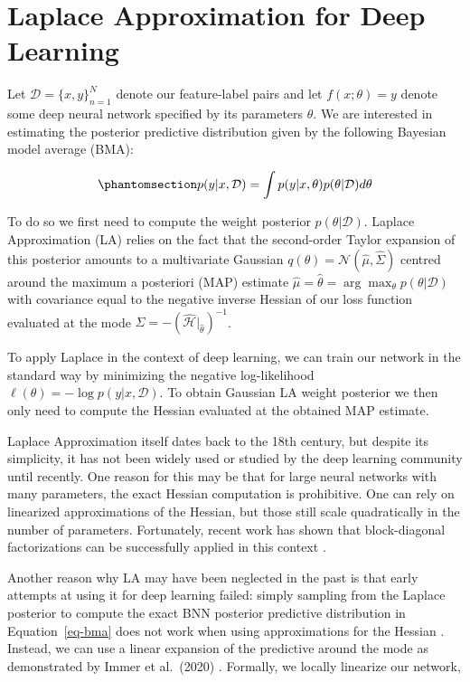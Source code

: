\documentclass{juliacon}
\begin{document}
\section{Laplace Approximation for Deep Learning}\label{sec-body}

Let \(\mathcal{D}=\{x,y\}_{n=1}^N\) denote our feature-label pairs and
let \(f(x;\theta)=y\) denote some deep neural network specified by its
parameters \(\theta\). We are interested in estimating the posterior
predictive distribution given by the following Bayesian model average
(BMA):

\begin{equation}\phantomsection\label{eq-bma}{
p(y|x,\mathcal{D}) = \int p(y|x,\theta)p(\theta|\mathcal{D})d\theta
}\end{equation}

To do so we first need to compute the weight posterior
\(p(\theta|\mathcal{D})\). Laplace Approximation (LA) relies on the fact
that the second-order Taylor expansion of this posterior amounts to a
multivariate Gaussian \(q(\theta)=\mathcal{N}(\hat\mu,\hat\Sigma)\)
centred around the maximum a posteriori (MAP) estimate
\(\hat\mu=\hat{\theta}=\arg\max_{\theta}p(\theta|\mathcal{D})\) with
covariance equal to the negative inverse Hessian of our loss function
evaluated at the mode
\(\hat{\Sigma}=-(\hat{\mathcal{H}}|_{\hat{\theta}})^{-1}\).

To apply Laplace in the context of deep learning, we can train our
network in the standard way by minimizing the negative log-likelihood
\(\ell(\theta)=-\log p(y|x,\mathcal{D})\). To obtain Gaussian LA weight
posterior we then only need to compute the Hessian evaluated at the
obtained MAP estimate.

Laplace Approximation itself dates back to the 18th century, but despite
its simplicity, it has not been widely used or studied by the deep
learning community until recently. One reason for this may be that for
large neural networks with many parameters, the exact Hessian
computation is prohibitive. One can rely on linearized approximations of
the Hessian, but those still scale quadratically in the number of
parameters. Fortunately, recent work has shown that block-diagonal
factorizations can be successfully applied in this context
\cite{martens2015optimizing}.

Another reason why LA may have been neglected in the past is that early
attempts at using it for deep learning failed: simply sampling from the
Laplace posterior to compute the exact BNN posterior predictive
distribution in Equation~\ref{eq-bma} does not work when using
approximations for the Hessian \cite{lawrence2001variational}. Instead,
we can use a linear expansion of the predictive around the mode as
demonstrated by Immer et al.~(2020) \cite{immer2020improving}. Formally,
we locally linearize our network,
\end{document}

